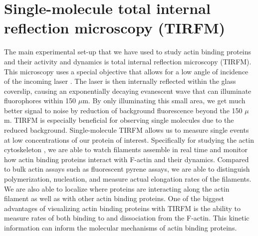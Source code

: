 \section{Single-molecule total internal reflection microscopy (TIRFM)}\label{tirfm}
The main experimental set-up that we have used to study actin binding proteins and their activity and dynamics is total internal reflection microscopy (TIRFM). This microscopy uses a special objective that allows for a low angle of incidence of the incoming laser \citep{fish_total_2009}. The laser is then internally reflected within the glass coverslip, causing an exponentially decaying evanescent wave that can illuminate fluorophores within 150 $\mu$m. By only illuminating this small area, we get much better signal to noise by reduction of background fluorescence beyond the 150 $\mu$m. TIRFM is especially beneficial for observing single molecules due to the reduced background. Single-molecule TIRFM allows us to measure single events at low concentrations of our protein of interest. Specifically for studying the actin cytoskeleton \citep{zimmermann_vitro_2016}, we are able to watch filaments assemble in real time and monitor how actin binding proteins interact with F-actin and their dynamics. Compared to bulk actin assays such as fluorescent pyrene assays, we are able to distinguish polymerization, nucleation, and measure actual elongation rates of the filaments. We are also able to localize where proteins are interacting along the actin filament as well as with other actin binding proteins. One of the biggest advantages of visualizing actin binding proteins with TIRFM is the ability to measure rates of both binding to and dissociation from the F-actin. This kinetic information can inform the molecular mechanisms of actin binding proteins.